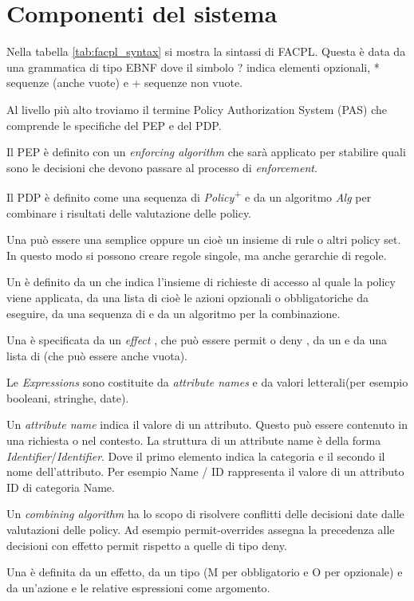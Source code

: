 \section{Componenti del sistema}
\label{sub:Componenti del sistema}
Nella tabella \ref{tab:facpl_syntax} si mostra la sintassi di FACPL. Questa è data da una grammatica di tipo EBNF dove il simbolo ? indica
elementi opzionali, * sequenze (anche vuote) e + sequenze non vuote.\par
Al livello più alto troviamo il termine Policy Authorization System (PAS) che comprende le specifiche del PEP e del PDP.\par
Il PEP è definito con un \emph{enforcing algorithm} che sarà applicato per stabilire quali sono le decisioni che devono
passare al processo di \emph{enforcement}.\par
Il PDP è definito come una sequenza di \emph{Policy}\textsuperscript{+} e da un algoritmo \emph{Alg} per combinare i
risultati delle valutazione delle policy.\par
{\label{Sintassi di FACPL}}
Una \ePolicy può essere una \eRule semplice oppure un \ePolicySet cioè un insieme di rule o altri
policy set. In questo modo si possono creare regole singole, ma anche gerarchie di regole.\par
Un \ePolicySet è definito da un \etarget che indica l'insieme di richieste di accesso al quale la policy
viene applicata, da una lista di \eObligations cioè le azioni opzionali o obbligatoriche da eseguire, da una
sequenza di \ePolicy e da un algoritmo per la combinazione.\par
Una \eRule  è specificata da un \emph{effect} , che può essere permit o deny , da un \etarget
e da una lista di \eObligations(che può essere anche vuota). \par
Le \emph{Expressions} sono costituite da \emph{attribute names} e da valori letterali(per esempio booleani, stringhe, date).\par
Un \emph{attribute name} indica il valore di un attributo. Questo può essere contenuto in una richiesta o nel contesto. La
struttura di un attribute name è della forma \emph{Identifier}/\emph{Identifier}. Dove il primo elemento indica la categoria
e il secondo il nome dell'attributo. Per esempio Name / ID rappresenta il valore di un attributo ID di categoria Name.\par
Un \emph{combining algorithm} ha lo scopo di risolvere conflitti delle decisioni date dalle valutazioni delle policy.
Ad esempio permit-overrides assegna la precedenza alle decisioni con effetto permit rispetto a quelle di tipo deny.\par
Una \eObligation è definita da un effetto, da un tipo (M per obbligatorio e O per opzionale) e da un'azione e le relative
espressioni come argomento.\par

